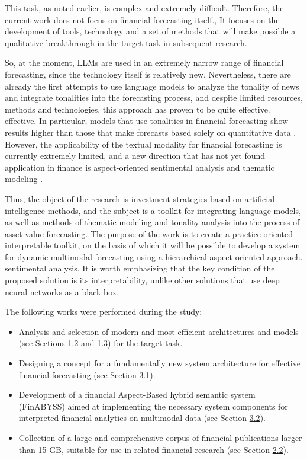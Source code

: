 This task, as noted earlier, is complex and extremely difficult. Therefore, the current work does not focus on financial forecasting itself.,
It focuses on the development of tools, technology and a set of methods that will make possible a qualitative breakthrough
in the target task in subsequent research.

So, at the moment, LLMs are used in an extremely narrow range of financial forecasting, since the technology itself is relatively new.
Nevertheless, there are already the first attempts to use language models to analyze the tonality of news and integrate tonalities into
the forecasting process, and despite limited resources, methods and technologies, this approach has proven to be quite effective.
effective. In particular, models that use tonalities in financial forecasting show results higher than those that make
forecasts based solely on quantitative data \parencite{Kim2023, Jiang2023, Halder2022}. However, the applicability of the textual
modality for financial forecasting is currently extremely limited, and a new direction that has not yet found application
in finance is aspect-oriented sentimental analysis \parencite{SA2020taxonomy,FSA2020problems} and thematic modeling
\parencite{angelov2020top2vec,BERTopic2022}.

Thus, the object of the research is investment strategies based on artificial intelligence methods, and the subject is a
toolkit for integrating language models, as well as methods of thematic modeling and tonality analysis into the process
of asset value forecasting. The purpose of the work is to create a practice-oriented interpretable toolkit, on the basis of which it will
be possible to develop a system for dynamic multimodal forecasting using a hierarchical aspect-oriented approach.
sentimental analysis. It is worth emphasizing that the key condition of the proposed solution is its interpretability,
unlike other solutions that use deep neural networks as a black box.

The following works were performed during the study:

\begin{itemize}
    \item Analysis and selection of modern and most efficient architectures and models (see Sections \hyperref[sec:ml_algos]{1.2} and
    \hyperref[sec:models]{1.3}) for the target task.
    \item Designing a concept for a fundamentally new system architecture for effective financial forecasting
    (see Section \hyperref[sec:architecture]{3.1}).
\item Development of a financial Aspect-Based hybrid semantic system (FinABYSS)
aimed at implementing the necessary system components for interpreted financial analytics on multimodal data
    (see Section \hyperref[sec:components]{3.2}).
\item Collection of a large and comprehensive corpus of financial publications larger than 15 GB, suitable for use in related financial research
(see Section \hyperref[sec:data_governance]{2.2}).
\end{itemize}

